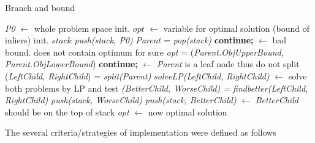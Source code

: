 \documentclass[paper=a4, fontsize=11pt]{scrartcl} %
\numberwithin{equation}{section} %
\numberwithin{figure}{section} %
\numberwithin{table}{section} %
\begin{document}
\begin{algorithm}
\caption{Branch and bound}\label{euclid}
\begin{algorithmic}[1]
\State \textit{P0} $\gets$ whole problem space
\State init. $\textit{opt}$ $\gets$ variable for optimal solution (bound of inliers)
\State init. $\textit{stack}$ 
\State \textit{push(stack, P0)}
\State 
{}
	\State \textit{Parent} = \textit{pop(stack)}
		\State \textbf{continue;} $\gets$ bad bound. does not contain optimum for sure
	\EndIf
	\State
        		\State \textit{opt} = (\textit{Parent.ObjUpperBound, Parent.ObjLowerBound})
        \EndIf
        	\State
        		\State \textbf{continue;} $\gets$ \textit{Parent} is a leaf node thus do not split
        \EndIf
        \State
        \State (\textit{LeftChild, RightChild}) = \textit{split(Parent)}
        \State \textit{solveLP(LeftChild, RightChild)} $\gets$ solve both problems by LP and test
	\State
	\State \textit{(BetterChild, WorseChild) = findbetter(LeftChild, RightChild)}
	\State \textit{push(stack, WorseChild)}	
	\State \textit{push(stack, BetterChild)} $\gets$ \textit{BetterChild} should be on the top of stack
\EndWhile
\State
\State \textit{opt} $\gets$ now optimal solution  
\end{algorithmic}
\end{algorithm}

\pagebreak

The several criteria/strategies of implementation were defined as follows
\end{document}
